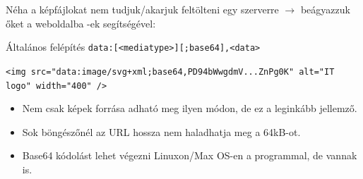 \begin{frame}
  Néha a képfájlokat nem tudjuk/akarjuk feltölteni egy szerverre $\to$ beágyazzuk őket a weboldalba -ek segítségével:
  \vfill
  \begin{exampleblock}{Általános felépítés}
    \texttt{data:[<mediatype>][;base64],<data>}
  \end{exampleblock}
  \begin{exampleblock}{}
    \scriptsize
    \texttt{<img src="data:image/svg+xml;base64,PD94bWwgdmV...ZnPg0K" alt="IT logo" width="400" />}
  \end{exampleblock}
  \vfill
  \small
  \begin{itemize}
    \item Nem csak képek forrása adható meg ilyen módon, de ez a leginkább jellemző.
    \item Sok böngészőnél az URL hossza nem haladhatja meg a 64kB-ot.
    \item Base64 kódolást lehet végezni Linuxon/Max OS-en a  programmal, de vannak   is.
  \end{itemize}
\end{frame}

